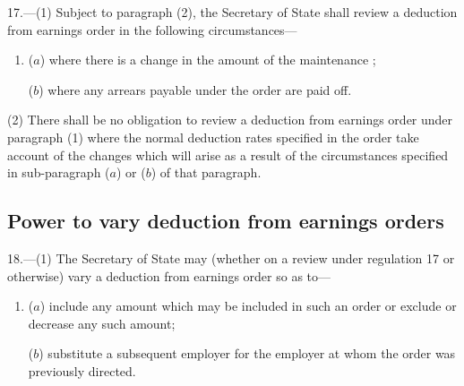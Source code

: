 \documentclass[12pt,a4paper]{article}
\begin{document}
%

17.—(1) Subject to paragraph (2), the Secretary of State shall review a deduction from earnings order in the following circumstances—
\begin{enumerate}\item[]
($a$) where there is a change in the amount of the maintenance 
;  %

($b$) where any arrears%
payable under the order are paid off.
\end{enumerate}

(2) There shall be no obligation to review a deduction from earnings order under paragraph (1) where the normal deduction rates specified in the order take account of the changes which will arise as a result of the circumstances specified in sub-paragraph ($a$) or ($b$) of that paragraph.


\subsection[18. Power to vary deduction from earnings orders]{Power to vary deduction from earnings orders}

18.—(1) The Secretary of State may (whether on a review under regulation 17 or otherwise) vary a deduction from earnings order so as to—
\begin{enumerate}\item[]
($a$) include any amount which may be included in such an order or exclude or decrease any such amount;

($b$) substitute a subsequent employer for the employer at whom the order was previously directed.
\end{enumerate}
\end{document}
